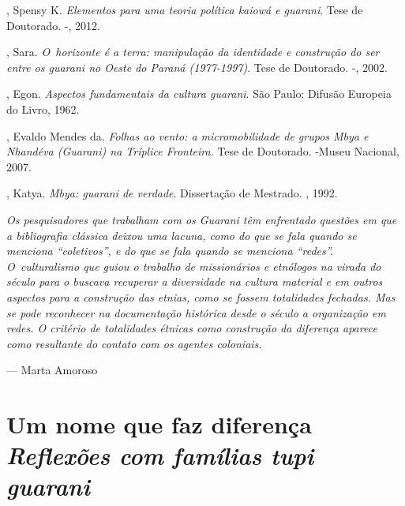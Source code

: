 \begin{Parskip}
, Spensy K. \emph{Elementos para uma teoria política kaiowá e guarani}.
 Tese de Doutorado. -, 2012.

, Sara. \emph{O~horizonte é a terra: manipulação da
identidade e construção do ser entre os guarani no Oeste do Paraná
(1977-1997)}. Tese de Doutorado. -, 2002.

, Egon. \emph{Aspectos fundamentais da cultura guarani}. São Paulo:
Difusão Europeia do Livro, 1962.

, Evaldo Mendes da. \emph{Folhas ao vento: a micromobilidade de grupos
Mbya e Nhandéva (Guarani) na Tríplice Fronteira}. Tese de Doutorado. -Museu Nacional, 2007.

, Katya. \emph{Mbya: guarani de verdade}. Dissertação de Mestrado. , 1992.
\end{Parskip}

\clearpage

\vspace*{\fill}

\begin{flushright}
\begin{minipage}[c]{0.85\textwidth}
\raggedleft
\footnotesize
\emph{Os pesquisadores que trabalham com os Guarani têm enfrentado questões em
que a bibliografia clássica deixou uma lacuna, como do que se fala
quando se menciona ``coletivos'', e do que se fala quando se menciona
``redes''. O~culturalismo que guiou o trabalho de missionários e etnólogos
na virada do século  para o  buscava recuperar a diversidade na
cultura material e em outros aspectos para a construção das etnias,
como se fossem totalidades fechadas. Mas se pode reconhecer na
documentação histórica desde o século  a organização em redes. O
critério de totalidades étnicas como construção da diferença aparece
como resultante do contato com os agentes coloniais.}

\smallskip
\hspace*{\fill}--- Marta Amoroso
\end{minipage}
\end{flushright}

\thispagestyle{empty}

\chapter*{Um nome que faz diferença\\
\large{\emph{Reflexões com famílias tupi guarani}}}

